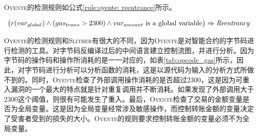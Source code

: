 \textsc{Oyente}的检测规则如公式\ref{rule:oyente: reentrance}所示。
\vspace{+3mm}
\begin{mdframed}[
	linewidth = 1pt,
	innertopmargin = -10pt,
	innerbottommargin = 3pt,
	outerlinewidth = 1pt
	]
    \small
	\begin{equation} \label{rule:oyente: reentrance}
    \big ( r(var_{global}) \wedge (gas_{trans} > 2300) \wedge var_{amount} \text{ is a global variable} \big )  \Rightarrow \text{\emph{Reentrancy}}
	\end{equation}
\end{mdframed}
\textsc{Oyente}的检测规则和\textsc{Slither}有很大的不同，因为\textsc{Oyente}是对智能合约的字节码进行检测的工具。对字节码反编译过后的中间语言建立控制流图，并进行分析。因为字节码的操作码和操作所消耗的是一一对应的，如表\ref{tab:opcode_gas}所示，因此，对字节码进行分析可以分析函数的消耗，这是以源代码为输入的分析方式所做不到的。同时，\textsc{Oyente}检查了外部调用操作消耗的是否超过2300，这是因为可重入漏洞的一个最大的特点就是针对重复调用并不断消耗。如果发现了外部调用大于2300这个阈值，则很有可能发生了重入。最后，\textsc{Oyente}检查了交易的金额变量是否为全局变量。这是因为全局变量经常涉及敏感操作，而控制转账金额的变量决定了受害者受到的损失的大小。\textsc{Oyente}的规则要求控制转账金额的变量必须不为全局变量。

